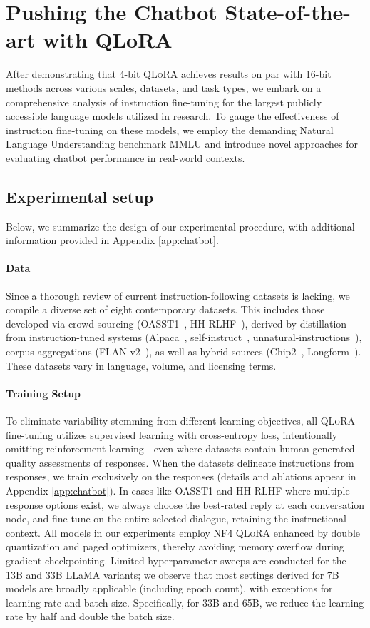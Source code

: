 \section{Pushing the Chatbot State-of-the-art with QLoRA}
\label{sec:pushing}
After demonstrating that 4-bit \textsc{QLoRA} achieves results on par with 16-bit methods across various scales, datasets, and task types, we embark on a comprehensive analysis of instruction fine-tuning for the largest publicly accessible language models utilized in research. To gauge the effectiveness of instruction fine-tuning on these models, we employ the demanding Natural Language Understanding benchmark MMLU and introduce novel approaches for evaluating chatbot performance in real-world contexts.

\subsection{Experimental setup} Below, we summarize the design of our experimental procedure, with additional information provided in Appendix \ref{app:chatbot}.

\paragraph{Data} Since a thorough review of current instruction-following datasets is lacking, we compile a diverse set of eight contemporary datasets. This includes those developed via crowd-sourcing (OASST1~\citep{kopf2023openassistant}, HH-RLHF~\citep{bai2022training}), derived by distillation from instruction-tuned systems (Alpaca~\citep{alpaca}, self-instruct~\citep{wang2022self}, unnatural-instructions~\citep{honovich2022unnatural}), corpus aggregations (FLAN v2~\citep{chung2022scaling}), as well as hybrid sources (Chip2~\citep{laion2023}, Longform~\citep{koksal2023longform}). These datasets vary in language, volume, and licensing terms.

\paragraph{Training Setup} To eliminate variability stemming from different learning objectives, all \textsc{QLoRA} fine-tuning utilizes supervised learning with cross-entropy loss, intentionally omitting reinforcement learning—even where datasets contain human-generated quality assessments of responses. When the datasets delineate instructions from responses, we train exclusively on the responses (details and ablations appear in Appendix \ref{app:chatbot}). In cases like OASST1 and HH-RLHF where multiple response options exist, we always choose the best-rated reply at each conversation node, and fine-tune on the entire selected dialogue, retaining the instructional context. All models in our experiments employ NF4 \textsc{QLoRA} enhanced by double quantization and paged optimizers, thereby avoiding memory overflow during gradient checkpointing. Limited hyperparameter sweeps are conducted for the 13B and 33B LLaMA variants; we observe that most settings derived for 7B models are broadly applicable (including epoch count), with exceptions for learning rate and batch size. Specifically, for 33B and 65B, we reduce the learning rate by half and double the batch size.

